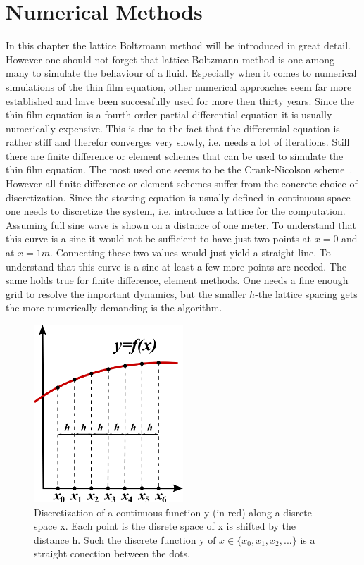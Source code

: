 \section{Numerical Methods}\label{sec:numerical_methods}
In this chapter the lattice Boltzmann method will be introduced in great detail.
However one should not forget that lattice Boltzmann method is one among many to simulate the behaviour of a fluid.
Especially when it comes to numerical simulations of the thin film equation, other numerical approaches seem far more established and have been successfully used for more then thirty years.
Since the thin film equation is a fourth order partial differential equation it is usually numerically expensive. 
This is due to the fact that the differential equation is rather stiff and therefor converges very slowly, i.e. needs a lot of iterations.
Still there are finite difference or element schemes that can be used to simulate the thin film equation.
The most used one seems to be the Crank-Nicolson scheme~\cite{crank_nicolson_1947, PhysRevE.63.011208, 10.5555/1403886}.
However all finite difference or element schemes suffer from the concrete choice of discretization.
Since the starting equation is usually defined in continuous space one needs to discretize the system, i.e. introduce a lattice for the computation. 
Assuming full sine wave is shown on a distance of one meter. 
To understand that this curve is a sine it would not be sufficient to have just two points at $x=0$ and at $x=1m$. 
Connecting these two values would  just yield a straight line.
To understand that this curve is a sine at least a few more points are needed.
The same holds true for finite difference, element methods.
One needs a fine enough grid to resolve the important dynamics, but the smaller $h$-the lattice spacing gets the more numerically demanding is the algorithm. 
\begin{figure}
    \centering
    \includegraphics[width=0.5\textwidth]{graphics/800px-Finite_Differences.svg.png}
    \caption{Discretization of a continuous function y (in red) along a disrete space x.
    Each point is the disrete space of x is shifted by the distance h.
    Such the discrete function y of $x\in\{x_0, x_1, x_2, ...\}$ is a straight conection between the dots.}
    \label{fig:finite_difference}
\end{figure}

